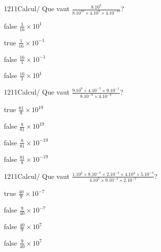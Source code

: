 \documentclass[11pt]{article}
\begin{document}
            \begin{question}{1211}{Calcul}{}{/}
                Que vaut $\frac{8.10^{8}}{8.10^{10}\times 4.10^{9}\times 4.10^{-10}}$?
            \end{question}
            
            \begin{reponses}
                \item[false] $\frac{1}{16}\times 10^{1}$
                \item[true] $\frac{1}{16}\times 10^{-1}$
                \item[false] $\frac{16}{1}\times 10^{-1}$
                \item[false] $\frac{16}{1}\times 10^{1}$
            \end{reponses}
            
            \begin{question}{1211}{Calcul}{}{/}
                Que vaut $\frac{9.10^{9}\times 4.10^{-5}\times 9.10^{-1}}{8.10^{-8}\times 4.10^{-8}}$?
            \end{question}
            
            \begin{reponses}
                \item[true] $\frac{81}{8}\times 10^{19}$
                \item[false] $\frac{8}{81}\times 10^{19}$
                \item[false] $\frac{8}{81}\times 10^{-19}$
                \item[false] $\frac{81}{8}\times 10^{-19}$
            \end{reponses}
            
            \begin{question}{1211}{Calcul}{}{/}
                Que vaut $\frac{1.10^{2}\times 8.10^{-7}\times 2.10^{-7}\times 4.10^{3}\times 5.10^{-4}}{4.10^{5}\times 9.10^{-4}\times 2.10^{-7}}$?
            \end{question}
            
            \begin{reponses}
                \item[true] $\frac{40}{9}\times 10^{-7}$
                \item[false] $\frac{9}{40}\times 10^{-7}$
                \item[false] $\frac{40}{9}\times 10^{7}$
                \item[false] $\frac{9}{40}\times 10^{7}$
            \end{reponses}
            
\end{document}
